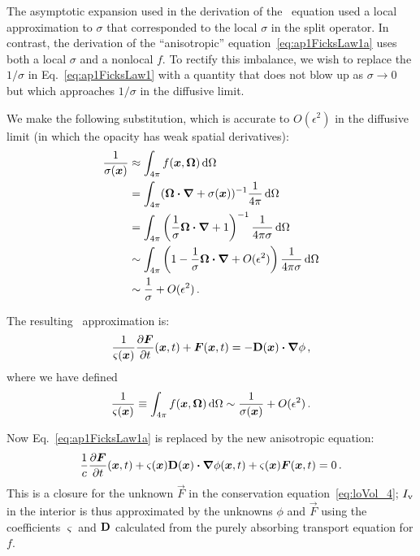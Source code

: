 The asymptotic expansion used in the derivation of the \Pone\ equation used a
local approximation to $\sigma$ that corresponded to the local $\sigma$ in the
split operator.
In contrast, the derivation of the ``anisotropic''
equation~\eqref{eq:ap1FicksLaw1a} uses both a local $\sigma$ and a nonlocal $f$.
To rectify this imbalance, we wish to replace the $1/\sigma$ in
Eq.~\eqref{eq:ap1FicksLaw1} with a quantity 
that does not blow up as $\sigma\to 0$ but which approaches $1/\sigma$ in the
diffusive limit.

We make the following substitution, which is accurate to $O(\epsilon^2)$ in the
diffusive limit (in which the opacity has weak spatial derivatives):
\begin{align*}
  \frac{1}{\sigma(\bm{x})}
  &\approx \int_{4\pi} f(\bm{x},\bm{\Omega}) \mathop{}\!\mathrm{d} \Omega
  \\
  &= \int_{4\pi} (\bm{\Omega} \bm{\cdot} \bm{\nabla} + \sigma(\bm{x}) )^{-1}
  \frac{1}{4\pi} \mathop{}\!\mathrm{d} \Omega
  \\
  &= \int_{4\pi} \left( \frac{1}{\sigma} \bm{\Omega} \bm{\cdot}
  \bm{\nabla} + 1 \right)^{-1} \frac{1}{4\pi\sigma} \mathop{}\!\mathrm{d} \Omega
  \\
  &\sim \int_{4\pi} \left(1 - \frac{1}{\sigma} \bm{\Omega} \bm{\cdot}
  \bm{\nabla} + O(\epsilon^2) \right) \frac{1}{4\pi\sigma} \mathop{}\!\mathrm{d} \Omega
  \\
  &\sim \frac{1}{\sigma} + O(\epsilon^2) \,.
\end{align*}

The resulting \APone\ approximation is:
\begin{equation*}
  \frac{1}{\varsigma(\bm{x})} \frac{\partial \bm{F}}{\partial t}(\bm{x},t)
  + \bm{F}(\bm{x},t) = - \mathbf{D}(\bm{x}) \bm{\cdot} \bm{\nabla} \phi \,,
\end{equation*}
where we have defined
\begin{equation}\label{eq:varSigma}
  \frac{1}{\varsigma(\bm{x})}
  \equiv \int_{4\pi} f(\bm{x},\bm{\Omega}) \mathop{}\!\mathrm{d} \Omega
  \sim \frac{1}{\sigma(\bm{x})} + O(\epsilon^2)\,.
\end{equation}

Now Eq.~\eqref{eq:ap1FicksLaw1a} is replaced by the new anisotropic \Pone
equation:
\begin{equation}\label{eq:ap1FicksLawFinal}
  \frac{1}{c}\frac{\partial \bm{F}}{\partial t}(\bm{x},t)
  + \varsigma(\bm{x}) \mathbf{D}(\bm{x}) \bm{\cdot} \bm{\nabla} \phi(\bm{x}, t)
  + \varsigma(\bm{x})\bm{F}(\bm{x},t) 
  = 0 \,.
\end{equation}
This is a closure for the unknown $\vec{F}$ in the conservation
equation~\eqref{eq:loVol_4}; $I_\mathrm{v}$ in the interior is thus approximated by
the unknowns $\phi$ and $\vec{F}$ using the coefficients $\varsigma$ and
$\mathbf{D}$ calculated from the purely absorbing transport equation for $f$.

